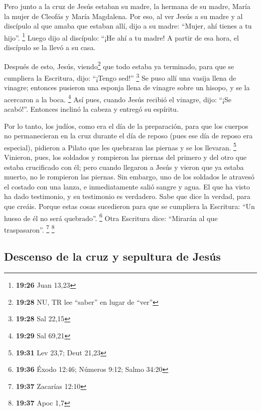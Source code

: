 \begin{paracol}{2}
 Pero junto a la cruz de Jesús estaban su madre, la
hermana de su madre, María la mujer de Cleofás y María Magdalena.
 Por eso, al ver Jesús a su madre y al discípulo al que
amaba que estaban allí, dijo a su madre: ``Mujer, ahí tienes a tu
hijo''. \footnote{\textbf{19:26} Juan 13,23}  Luego dijo
al discípulo: ``¡He ahí a tu madre! A partir de esa hora, el discípulo
se la llevó a su casa.

 Después de esto, Jesús, viendo\footnote{\textbf{19:28}
  NU, TR lee ``saber'' en lugar de ``ver''} que todo estaba ya
terminado, para que se cumpliera la Escritura, dijo: ``¡Tengo sed!''
\footnote{\textbf{19:28} Sal 22,15}  Se puso allí una
vasija llena de vinagre; entonces pusieron una esponja llena de vinagre
sobre un hisopo, y se la acercaron a la boca. \footnote{\textbf{19:29}
  Sal 69,21}  Así pues, cuando Jesús recibió el vinagre,
dijo: ``¡Se acabó!''. Entonces inclinó la cabeza y entregó su espíritu.

 Por lo tanto, los judíos, como era el día de la
preparación, para que los cuerpos no permanecieran en la cruz durante el
día de reposo (pues ese día de reposo era especial), pidieron a Pilato
que les quebraran las piernas y se los llevaran. \footnote{\textbf{19:31}
  Lev 23,7; Deut 21,23}  Vinieron, pues, los soldados y
rompieron las piernas del primero y del otro que estaba crucificado con
él;  pero cuando llegaron a Jesús y vieron que ya estaba
muerto, no le rompieron las piernas.  Sin embargo, uno de
los soldados le atravesó el costado con una lanza, e inmediatamente
salió sangre y agua.  El que ha visto ha dado testimonio,
y su testimonio es verdadero. Sabe que dice la verdad, para que creáis.
 Porque estas cosas sucedieron para que se cumpliera la
Escritura: ``Un hueso de él no será quebrado''. \footnote{\textbf{19:36}
  Éxodo 12:46; Números 9:12; Salmo 34:20}  Otra Escritura
dice: ``Mirarán al que traspasaron''. \footnote{\textbf{19:37} Zacarías
  12:10} \footnote{\textbf{19:37} Apoc 1,7}

\hypertarget{descenso-de-la-cruz-y-sepultura-de-jesuxfas}{%
\subsection{Descenso de la cruz y sepultura de
Jesús}\label{descenso-de-la-cruz-y-sepultura-de-jesuxfas}}


\end{paracol}
